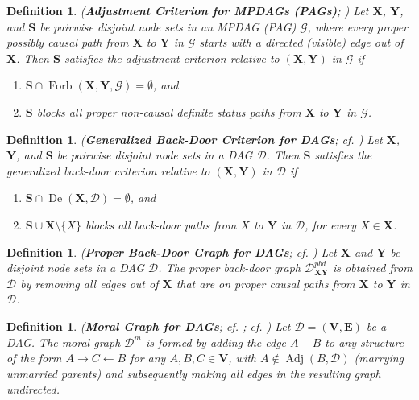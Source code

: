 \documentclass[twoside]{article}
\newtheorem{definition}[theorem]{Definition}
\DeclareMathOperator{\De}{De}
\DeclareMathOperator{\Adj}{Adj}
\DeclareMathOperator{\Forb}{Forb}
\newcommand{\fb}[2][X,Y]{\Forb(\mb{#1},#2)}
\newcommand{\dpbd}[2][G]{\mathcal{D}_{\mb{#2}}^{pbd}}
\newcommand{\mb}[1]{\mathbf{#1}}
\newcommand{\g}[1][G]{\mathcal{#1}}
\begin{document}
\begin{definition}
\label{def:ac}
{\normalfont (\textbf{Adjustment Criterion for MPDAGs (PAGs)}; \citealp{perkovic2017interpreting, perkovic2018complete})}
    Let $\mb{X}$, $\mb{Y}$, and $\mb{S}$ be pairwise disjoint node sets in an MPDAG (PAG) $\g$, where every proper possibly causal path from $\mb{X}$ to $\mb{Y}$ in $\g$ starts with a directed (visible) edge out of $\mb{X}$. Then $\mb{S}$ satisfies the adjustment criterion relative to $(\mb{X},\mb{Y})$ in $\g$ if 
    \begin{enumerate}[label=\emph{(\alph*)}]
        \item $\mb{S} \cap \fb{\g} = \emptyset$, and
        \item $\mb{S}$ blocks all proper non-causal definite status paths from $\mb{X}$ to $\mb{Y}$ in $\g$. \label{def:ac-b}
    \end{enumerate}
\end{definition}



\begin{definition}
\label{def:gbc}
{\normalfont (\textbf{Generalized Back-Door Criterion for DAGs}; cf. \citealp{maathuis2015generalized})}
    Let $\mb{X}$, $\mb{Y}$, and $\mb{S}$ be pairwise disjoint node sets in a DAG $\g[D]$. Then $\mb{S}$ satisfies the generalized back-door criterion relative to $(\mb{X},\mb{Y})$ in $\g[D]$ if 
    \begin{enumerate}[label=\emph{(\alph*)}]
        \item $\mb{S} \cap \De(\mb{X},\g[D]) = \emptyset$, and
        \item $\mb{S} \cup \mb{X} \setminus \{X\}$ blocks all back-door paths from $X$ to $\mb{Y}$ in $\g[D]$, for every $X \in \mb{X}$.
    \end{enumerate}
\end{definition}



\begin{definition}
\label{def:pbd}
{\normalfont (\textbf{Proper Back-Door Graph for DAGs}; cf. \citealp{perkovic2018complete})}
    Let $\mb{X}$ and $\mb{Y}$ be disjoint node sets in a DAG $\g[D]$. The proper back-door graph $\dpbd{\mb{XY}}$ is obtained from $\g[D]$ by removing all edges out of $\mb{X}$ that are on proper causal paths from $\mb{X}$ to $\mb{Y}$ in $\g[D]$.
\end{definition}


\begin{definition}
\label{def:moral}
{\normalfont (\textbf{Moral Graph for DAGs}; cf. \citealp{lauritzen1988local}; cf. \citealp{perkovic2018complete})} 
    Let $\g[D]=(\mb{V},\mb{E})$ be a DAG. The moral graph $\g[D]^m$ is formed by adding the edge $A-B$ to any structure of the form $A \to C \gets B$ for any $A,B,C \in \mb{V}$, with $A \notin \Adj(B,\g[D])$ (marrying unmarried parents) and subsequently making all edges in the resulting graph undirected.
\end{definition}
\end{document}
